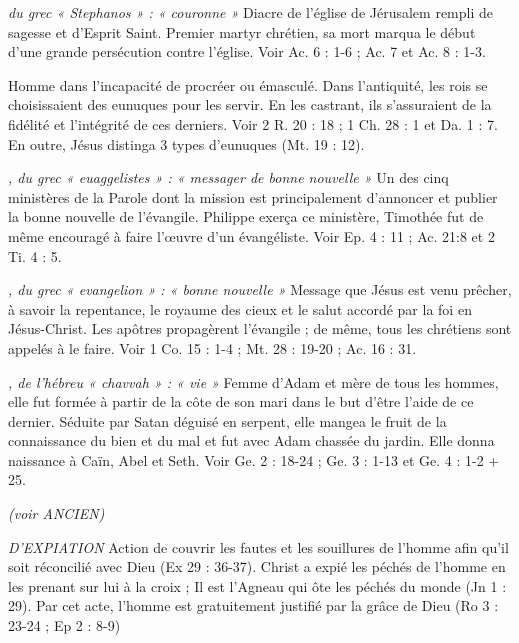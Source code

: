 \begin{multicols}{2}
\textit{du grec « Stephanos » : « couronne »}\newline
Diacre de l'église de Jérusalem rempli de sagesse et d'Esprit Saint. Premier martyr chrétien, sa mort marqua le début d'une grande persécution contre l’église. Voir Ac. 6 : 1-6 ; Ac. 7 et Ac. 8 : 1-3.

\textit{}\newline
Homme dans l'incapacité de procréer ou émasculé. Dans l'antiquité, les rois se choisissaient des eunuques pour les servir. En les castrant, ils s’assuraient de la fidélité et l’intégrité de ces derniers. Voir 2 R. 20 : 18 ; 1 Ch. 28 : 1 et Da. 1 : 7. En outre, Jésus distinga 3 types d'eunuques (Mt. 19 : 12).

\textit{, du grec « euaggelistes » : « messager de bonne nouvelle »}\newline
Un des cinq ministères de la Parole dont la mission est principalement d’annoncer et publier la bonne nouvelle de l’évangile. Philippe exerça ce ministère, Timothée fut de même encouragé à faire l'œuvre d'un évangéliste. Voir Ep. 4 : 11 ; Ac. 21:8 et 2 Ti. 4 : 5.

\textit{, du grec « evangelion » : « bonne nouvelle »}\newline
Message que Jésus est venu prêcher, à savoir la repentance, le royaume des cieux et le salut accordé par la foi en Jésus-Christ. Les apôtres propagèrent l'évangile ; de même, tous les chrétiens sont appelés à le faire. Voir 1 Co. 15 : 1-4 ; Mt. 28 : 19-20 ; Ac. 16 : 31.

\textit{, de l'hébreu « chavvah » : « vie »}\newline
Femme d'Adam et mère de tous les hommes, elle fut formée à partir de la côte de son mari dans le but d’être l’aide de ce dernier. Séduite par Satan déguisé en serpent, elle mangea le fruit de la connaissance du bien et du mal et fut avec Adam chassée du jardin. Elle donna naissance à Caïn, Abel et Seth. Voir Ge. 2 : 18-24 ; Ge. 3 : 1-13 et Ge. 4 : 1-2 + 25.

\textit{(voir ANCIEN)}\newline

\textit{D’EXPIATION}\newline
Action de couvrir les fautes et les souillures de l'homme afin qu'il soit réconcilié avec Dieu (Ex 29 : 36-37). Christ a expié les péchés de l'homme en les prenant sur lui à la croix ; Il est l'Agneau qui ôte les péchés du monde (Jn 1 : 29). Par cet acte, l'homme est gratuitement justifié par la grâce de Dieu (Ro 3 : 23-24 ; Ep 2 : 8-9)


\end{multicols}
